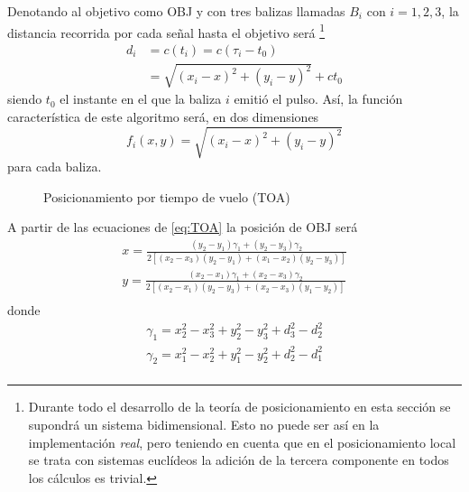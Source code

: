 Denotando al objetivo como OBJ y con tres balizas llamadas $B_i$ con $i=1,2,3$, la distancia recorrida por cada señal hasta el objetivo será \footnote{Durante todo el desarrollo de la teoría de posicionamiento en esta sección se supondrá un sistema bidimensional. Esto no puede ser así en la implementación \textit{real}, pero teniendo en cuenta que en el posicionamiento local se trata con sistemas euclídeos la adición de la tercera componente en todos los cálculos es trivial.}
\begin{equation}\label{eq:TOA}
    \begin{aligned}
        d_i &= c(t_i) = c(\tau_i - t_0) \\
        &= \sqrt{(x_i - x)^2 + (y_i - y)^2} + ct_0
    \end{aligned}
\end{equation}
siendo $t_0$ el instante en el que la baliza $i$ emitió el pulso.
Así, la función característica de este algoritmo será, en dos dimensiones
\begin{equation}
    f_i(x, y) = \sqrt{(x_i - x)^2 + (y_i - y)^2}
\end{equation}
para cada baliza.

\begin{figure}[H]
    \centering
    \def\svgwidth{0.6\linewidth}
    
	\caption{Posicionamiento por tiempo de vuelo (TOA)}
    \label{fig:TOA}
\end{figure}

A partir de las ecuaciones de \eqref{eq:TOA} la posición de OBJ será \cite{Zafer}
\begin{equation}
    \begin{aligned}
        x = \frac{(y_2-y_1)\gamma_1 + (y_2-y_3)\gamma_2}{2[(x_2-x_3)(y_2-y_1) + (x_1 - x_2)(y_2 - y_3)]}\\
        y = \frac{(x_2-x_1)\gamma_1 + (x_2-x_3)\gamma_2}{2[(x_2-x_1)(y_2-y_3) + (x_2 - x_3)(y_1 - y_2)]}\\
    \end{aligned}
\end{equation}
donde
\begin{equation}
    \begin{aligned}
        \gamma_1 = x_2^2 - x_3^2 + y_2^2 - y_3^2 + d_3^2 - d_2^2 \\
        \gamma_2 = x_1^2 - x_2^2 + y_1^2 - y_2^2 + d_2^2 - d_1^2 \\
    \end{aligned}
\end{equation}

